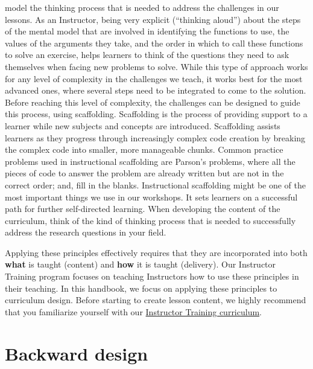 \documentclass[
]{book}
\begin{document}
\begin{enumerate}
  model the thinking process that is needed to address the challenges
  in our lessons. As an Instructor, being very explicit (``thinking
  aloud'') about the steps of the mental model that are involved in identifying
  the functions to use, the values of the arguments they take, and the order in
  which to call these functions to solve an exercise, helps learners to think
  of the questions they need to ask themselves when facing new problems to
  solve. While this type of approach works for any level of complexity in the
  challenges we teach, it works best for the most advanced ones, where several steps
  need to be integrated to come to the solution. Before reaching this level of
  complexity, the challenges can be designed to guide this process, using
  scaffolding. Scaffolding is the process of providing support to a learner while
  new subjects and concepts are introduced. Scaffolding assists learners as they
  progress through increasingly complex code creation by breaking the complex code
  into smaller, more manageable chunks. Common practice problems used in instructional
  scaffolding are Parson's problems, where all the pieces of code to answer the problem
  are already written but are not in the correct order; and, fill in the blanks.
  Instructional scaffolding might be one of the most important
  things we use in our workshops. It sets learners on a successful path
  for further self-directed learning. When developing the content of the curriculum, think of the
  kind of thinking process that is needed to successfully address the research
  questions in your field.
\end{enumerate}

Applying these principles effectively requires that they are incorporated into both
\textbf{what} is taught (content) and \textbf{how} it is taught (delivery). Our
Instructor Training program focuses on teaching Instructors how to use these principles
in their teaching. In this handbook, we focus on applying these principles to
curriculum design. Before starting to create lesson content, we highly recommend that you familiarize yourself with our \href{https://carpentries.github.io/instructor-training/}{Instructor Training curriculum}.

\hypertarget{backward-design}{%
\section{Backward design}\label{backward-design}}
\end{document}
